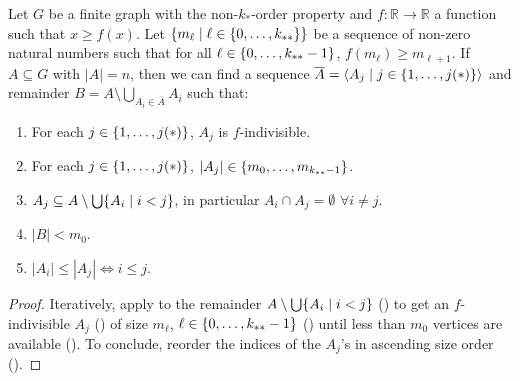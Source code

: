         \begin{lemma} \label{lem:existance_of_ordered_f_indivisible_partitions}
            Let $G$ be a finite graph with the non-$k_{*}$-order property and $f: \mathbb{R} \longrightarrow \mathbb{R}$ a function
            such that $x \geq f(x)$.
            Let $\{ m_\ell \mid \ell \in \{ 0, \dots, k_{**} \} \}$ be a sequence of non-zero natural numbers such that
            for all $\ell \in \{ 0, \dots, k_{**}-1 \}$, $f(m_{\ell}) \geq m_{\ell+1}$.
            If $A \subseteq G$ with $|A| = n$, then we can find a sequence $\overline{A} = \left< A_j \mid j \in \{ 1, \dots, j(*) \} \right>$
            and remainder $B = A \setminus \bigcup_{A_i \in \overline{A}} A_i$ such that:
            \begin{enumerate}[label={\Roman*}., ref={\Roman*}, font=\rmfamily]
                \item \label{itm:existance_of_ordered_f_indivisible_partitions.1} For each $j \in \{ 1, \dots, j(*) \}$, $A_j$ is $f$-indivisible.
                \item \label{itm:existance_of_ordered_f_indivisible_partitions.2} For each $j \in \{ 1, \dots, j(*) \}$, $|A_j| \in \{ m_0, \dots, m_{k_{**}-1} \}$.
                \item \label{itm:existance_of_ordered_f_indivisible_partitions.3} $A_j \subseteq A \setminus \bigcup\{ A_i \mid i < j \}$, in particular $A_i \cap A_j = \emptyset$ $\forall i \neq j$.
                \item \label{itm:existance_of_ordered_f_indivisible_partitions.4} $|B| < m_0$.
                \item \label{itm:existance_of_ordered_f_indivisible_partitions.5} $|A_i| \leq |A_j| \Leftrightarrow i \leq j$.
            \end{enumerate}
            \begin{proof}
                Iteratively, apply  to the remainder $A \setminus \bigcup \{ A_i \mid i < j \}$
                () to get an $f$-indivisible $A_j$ () of size $m_\ell$, $\ell \in \{ 0, \dots, k_{**}-1 \}$
                () until less than $m_0$ vertices are available ().
                To conclude, reorder the indices of the $A_j$'s in ascending size order ().
            \end{proof}
        \end{lemma}

